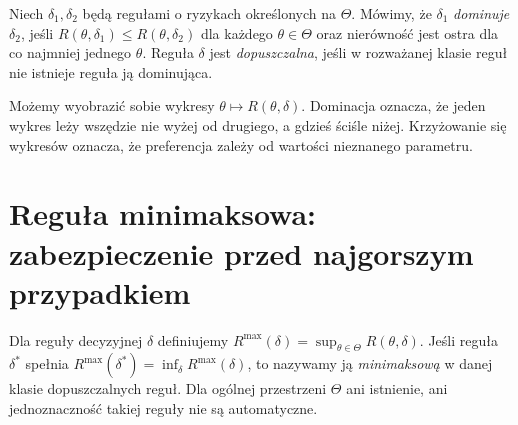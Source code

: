 \begin{definicja}\label{def:admissible}
Niech $\delta_1,\delta_2$ będą regułami o ryzykach określonych
na $\Theta$. Mówimy, że $\delta_1$ \emph{dominuje} $\delta_2$,
jeśli $R(\theta,\delta_1)\le R(\theta,\delta_2)$ dla każdego
$\theta\in\Theta$ oraz nierówność jest ostra dla co najmniej jednego
$\theta$. Reguła $\delta$ jest \emph{dopuszczalna}, jeśli w rozważanej
klasie reguł nie istnieje reguła ją dominująca.
\end{definicja}

\begin{uwaga}
Możemy wyobrazić sobie wykresy $\theta\mapsto R(\theta,\delta)$.
Dominacja oznacza, że jeden wykres leży wszędzie nie wyżej od
drugiego, a gdzieś ściśle niżej. Krzyżowanie się wykresów oznacza,
że preferencja zależy od wartości nieznanego parametru.
\end{uwaga}

\section{Reguła minimaksowa: zabezpieczenie przed najgorszym przypadkiem}
\begin{definicja}\label{def:minimax}
Dla reguły decyzyjnej $\delta$ definiujemy
$R^{\max}(\delta)=\sup_{\theta\in\Theta}R(\theta,\delta)$.
Jeśli reguła $\delta^*$ spełnia
$R^{\max}(\delta^*)=\inf_\delta R^{\max}(\delta)$, to nazywamy ją
\emph{minimaksową} w danej klasie dopuszczalnych reguł.
Dla ogólnej przestrzeni $\Theta$ ani istnienie, ani jednoznaczność
takiej reguły nie są automatyczne.
\end{definicja}

